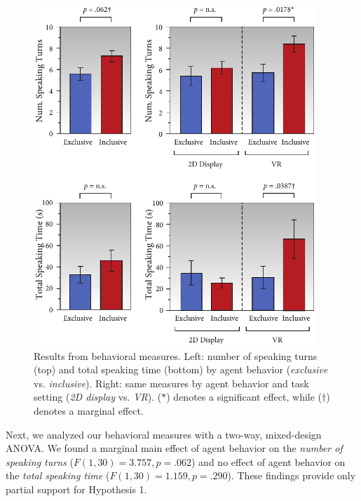 \begin{figure}
\centering
\includegraphics[width=0.95\textwidth]{conversationalrolegaze/Figures/ResultsBehavioral.pdf}
\caption{Results from behavioral measures. Left: number of speaking turns (top) and total speaking time (bottom) by agent behavior (\emph{exclusive} vs. \emph{inclusive}). Right: same measures by agent behavior and task setting (\emph{2D display} vs. \emph{VR}). ($*$) denotes a significant effect, while ($\dagger$) denotes a marginal effect.}
\label{fig:GazeFootingResultsBehavioral}
\end{figure}

Next, we analyzed our behavioral measures with a two-way, mixed-design ANOVA. We found a marginal main effect of agent behavior on the \emph{number of speaking turns} ($F(1, 30) = 3.757, p = .062$) and no effect of agent behavior on the \emph{total speaking time} ($F(1, 30) = 1.159, p = .290$). These findings provide only partial support for Hypothesis 1.

